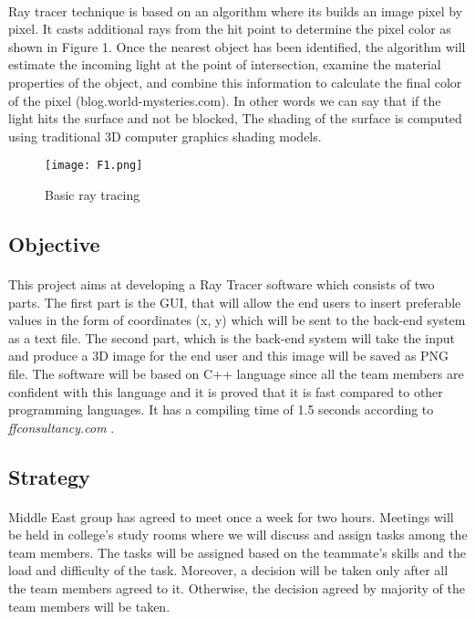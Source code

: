 \documentclass{article}
\begin{document}
\paragraph{}
Ray tracer technique is based on an algorithm where its builds an image pixel by pixel. It casts additional rays from the hit point to determine the pixel color as shown in Figure 1.
Once the nearest object has been identified, the algorithm will estimate the incoming light at the point of intersection, examine the material properties of the object, and combine this information to calculate the final color of the pixel (blog.world-mysteries.com). In other words we can say that if the light hits the surface and not be blocked,  The shading of the surface is computed using traditional 3D computer graphics shading models. 

\begin{figure}
    \centering
    \texttt{[image: F1.png]}
    \caption{Basic ray tracing}
    \label{figure1}
\end{figure}

\subsection{Objective}

\paragraph{}
This project aims at developing a Ray Tracer software which consists of two parts. The first part is the GUI, that will allow the end users to insert preferable values in the form of coordinates (x, y) which will be sent to the back-end system as a text file.
The second part, which is the back-end system will take the input and produce  a 3D image for the end user and this image will be saved as PNG file. 
The software will be based on C++ language since all the team members are confident with this language and it is proved that it is fast compared to other programming languages. It has a compiling time of 1.5 seconds according to \textit{ffconsultancy.com }.

\subsection{Strategy}
\paragraph{}
Middle East group has agreed to meet once a week for two hours. Meetings will be held in college's study rooms where we will discuss and assign tasks among the team members. The tasks will be assigned based on the teammate's skills and the load and difficulty of the task. Moreover,  a decision will be taken only after all the team members agreed to it. Otherwise, the decision agreed by majority of the team members will be taken.
\end{document}
